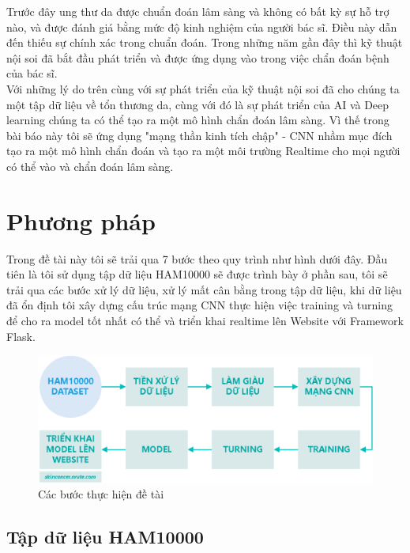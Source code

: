 \documentclass[12pt,a4paper]{article}
\begin{document}
	\noindent
	Trước đây ung thư da được chuẩn đoán lâm sàng và không có bất kỳ sự hỗ trợ nào, và được đánh giá bằng mức độ kinh nghiệm của người bác sĩ. Điều này dẫn đến thiếu sự chính xác trong chuẩn đoán. Trong những năm gần đây thì kỹ thuật nội soi đã bắt đầu phát triển và được ứng dụng vào  trong việc chẩn đoán bệnh của bác sĩ.\\
	
	\noindent
	Với những lý do trên cùng với sự phát triển của kỹ thuật nội soi đã cho chúng ta một tập dữ liệu về tổn thương da, cùng với đó là sự phát triển của AI và Deep learning chúng ta có thể tạo ra một mô hình chẩn đoán lâm sàng. Vì thế trong bài báo này tôi sẽ ứng dụng "mạng thần kinh tích chập" - CNN nhầm mục đích tạo ra một mô hình chẩn đoán và tạo ra một môi trường Realtime cho mọi người có thể vào và chẩn đoán lâm sàng.
	
	
	\section{Phương pháp}
	
	Trong đề tài này tôi sẽ trải qua 7 bước theo quy trình như hình dưới đây. Đầu tiên là tôi sử dụng tập dữ liệu HAM10000 sẽ được trình bày ở phần sau, tôi sẽ trải qua các bước xử lý dữ liệu, xử lý mất cân bằng trong tập dữ liệu, khi dữ liệu đã ổn định tôi xây dựng cấu trúc mạng CNN thực hiện việc training và turning để cho ra model tốt nhất có thể và triển khai realtime lên Website với Framework Flask.
	
	\begin{figure}[h!]
		\centering
		\includegraphics[width=0.8\linewidth]{./images/quatrinh.eps}
		\caption{Các bước thực hiện đề tài}
		\label{fig:quatrinh}
	\end{figure}
	
	\subsection{Tập dữ liệu HAM10000}
	
\end{document}
